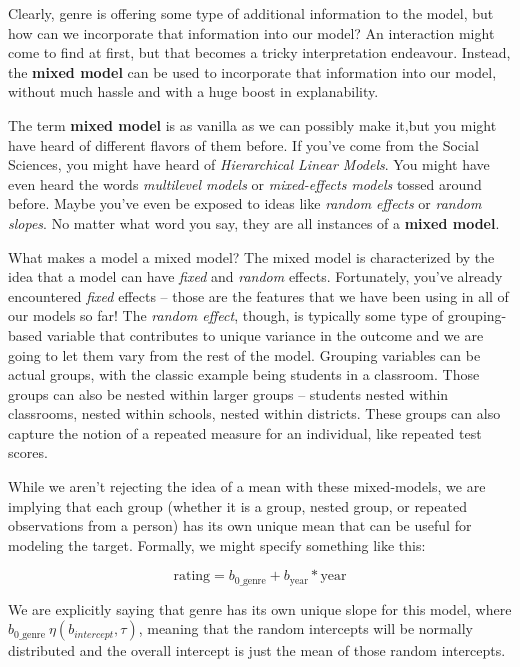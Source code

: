 \documentclass[
  letterpaper,
]{krantz}
\begin{document}
Clearly, genre is offering some type of additional information to the
model, but how can we incorporate that information into our model? An
interaction might come to find at first, but that becomes a tricky
interpretation endeavour. Instead, the \textbf{mixed model} can be used
to incorporate that information into our model, without much hassle and
with a huge boost in explanability.

The term \textbf{mixed model} is as vanilla as we can possibly make
it,but you might have heard of different flavors of them before. If
you've come from the Social Sciences, you might have heard of
\emph{Hierarchical Linear Models}. You might have even heard the words
\emph{multilevel models} or \emph{mixed-effects models} tossed around
before. Maybe you've even be exposed to ideas like \emph{random effects}
or \emph{random slopes}. No matter what word you say, they are all
instances of a \textbf{mixed model}.

What makes a model a mixed model? The mixed model is characterized by
the idea that a model can have \emph{fixed} and \emph{random} effects.
Fortunately, you've already encountered \emph{fixed} effects -- those
are the features that we have been using in all of our models so far!
The \emph{random effect}, though, is typically some type of
grouping-based variable that contributes to unique variance in the
outcome and we are going to let them vary from the rest of the model.
Grouping variables can be actual groups, with the classic example being
students in a classroom. Those groups can also be nested within larger
groups -- students nested within classrooms, nested within schools,
nested within districts. These groups can also capture the notion of a
repeated measure for an individual, like repeated test scores.

While we aren't rejecting the idea of a mean with these mixed-models, we
are implying that each group (whether it is a group, nested group, or
repeated observations from a person) has its own unique mean that can be
useful for modeling the target. Formally, we might specify something
like this:

\[
\textrm{rating} = b_{\textrm{0\_genre}} + b_\textrm{year}*\textrm{year}
\]

We are explicitly saying that genre has its own unique slope for this
model, where \(b_{\text{0\_genre}} ~ \eta(b_{intercept}, \tau)\),
meaning that the random intercepts will be normally distributed and the
overall intercept is just the mean of those random intercepts.
\end{document}
